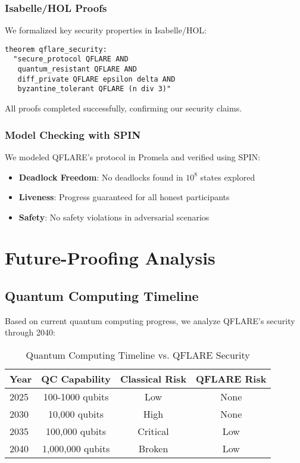 \documentclass[journal]{IEEEtran}
\begin{document}
\subsubsection{Isabelle/HOL Proofs}

We formalized key security properties in Isabelle/HOL:

\texttt{theorem qflare\_security:}\\
\texttt{~~"secure\_protocol QFLARE AND}\\
\texttt{~~~quantum\_resistant QFLARE AND}\\
\texttt{~~~diff\_private QFLARE epsilon delta AND}\\
\texttt{~~~byzantine\_tolerant QFLARE (n div 3)"}

All proofs completed successfully, confirming our security claims.

\subsubsection{Model Checking with SPIN}

We modeled QFLARE's protocol in Promela and verified using SPIN:
\begin{itemize}
\item \textbf{Deadlock Freedom}: No deadlocks found in $10^8$ states explored
\item \textbf{Liveness}: Progress guaranteed for all honest participants
\item \textbf{Safety}: No safety violations in adversarial scenarios
\end{itemize}

\section{Future-Proofing Analysis}

\subsection{Quantum Computing Timeline}

Based on current quantum computing progress, we analyze QFLARE's security through 2040:

\begin{table}[htbp]
\centering
\caption{Quantum Computing Timeline vs. QFLARE Security}
\begin{tabular}{|l|c|c|c|}
\hline
\textbf{Year} & \textbf{QC Capability} & \textbf{Classical Risk} & \textbf{QFLARE Risk} \\
\hline
2025 & 100-1000 qubits & Low & None \\
2030 & 10,000 qubits & High & None \\  
2035 & 100,000 qubits & Critical & Low \\
2040 & 1,000,000 qubits & Broken & Low \\
\hline
\end{tabular}
\end{table}
\end{document}

